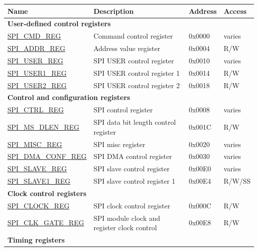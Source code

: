 

\begin{longtable}{ | p{6cm} | p{6.9cm} | p{1.3cm} | p{1.5cm} | }
\hline\rowcolor{lightgray}
\textbf{Name} & \textbf{Description} &  \textbf{Address} & \textbf{Access} \\ \hline
\endhead
\multicolumn{4}{|l|}{\textbf{User-defined control registers}} \\ \hline
\hyperref[regdesc:SPICMDREG]{SPI\_CMD\_REG} & Command control register & 0x0000 & varies \\ \hline
\hyperref[regdesc:SPIADDRREG]{SPI\_ADDR\_REG} & Address value register & 0x0004 & R/W \\ \hline
\hyperref[regdesc:SPIUSERREG]{SPI\_USER\_REG} & SPI USER control register & 0x0010 & varies \\ \hline
\hyperref[regdesc:SPIUSER1REG]{SPI\_USER1\_REG} & SPI USER control register 1 & 0x0014 & R/W \\ \hline
\hyperref[regdesc:SPIUSER2REG]{SPI\_USER2\_REG} & SPI USER control register 2 & 0x0018 & R/W \\ \hline
\multicolumn{4}{|l|}{\textbf{Control and configuration registers}} \\ \hline
\hyperref[regdesc:SPICTRLREG]{SPI\_CTRL\_REG} & SPI control register & 0x0008 & varies \\ \hline
\hyperref[regdesc:SPIMSDLENREG]{SPI\_MS\_DLEN\_REG} & SPI data bit length control register & 0x001C & R/W \\ \hline
\hyperref[regdesc:SPIMISCREG]{SPI\_MISC\_REG} & SPI misc register & 0x0020 & varies \\ \hline
\hyperref[regdesc:SPIDMACONFREG]{SPI\_DMA\_CONF\_REG} & SPI DMA control register & 0x0030 & varies \\ \hline
\hyperref[regdesc:SPISLAVEREG]{SPI\_SLAVE\_REG} & SPI slave control register & 0x00E0 & varies \\ \hline
\hyperref[regdesc:SPISLAVE1REG]{SPI\_SLAVE1\_REG} & SPI slave control register 1 & 0x00E4 & R/W/SS \\ \hline
\multicolumn{4}{|l|}{\textbf{Clock control registers}} \\ \hline
\hyperref[regdesc:SPICLOCKREG]{SPI\_CLOCK\_REG} & SPI clock control register & 0x000C & R/W \\ \hline
\hyperref[regdesc:SPICLKGATEREG]{SPI\_CLK\_GATE\_REG} & SPI module clock and register clock control & 0x00E8 & R/W \\ \hline
\multicolumn{4}{|l|}{\textbf{Timing registers}} \\ \hline

\end{longtable}
